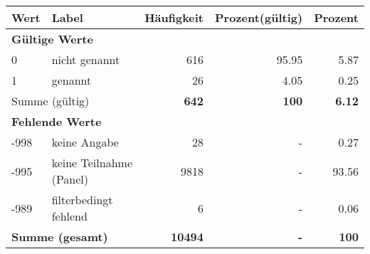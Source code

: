      \begin{longtable}{lXrrr}
     \toprule
     \textbf{Wert} & \textbf{Label} & \textbf{Häufigkeit} & \textbf{Prozent(gültig)} & \textbf{Prozent} \\
     \endhead
     \midrule
     \multicolumn{5}{l}{\textbf{Gültige Werte}}\\

     0 &
     \multicolumn{1}{X}{ nicht genannt   } &


       \num{616} &
       \num[round-mode=places,round-precision=2]{95.95} &
         \num[round-mode=places,round-precision=2]{5.87} \\

     1 &
     \multicolumn{1}{X}{ genannt   } &


       \num{26} &
       \num[round-mode=places,round-precision=2]{4.05} &
         \num[round-mode=places,round-precision=2]{0.25} \\
     \midrule
     \multicolumn{2}{l}{Summe (gültig)} &
       \textbf{\num{642}} &
     \textbf{\num{100}} &
       \textbf{\num[round-mode=places,round-precision=2]{6.12}} \\
     \multicolumn{5}{l}{\textbf{Fehlende Werte}}\\
       -998 &
       keine Angabe &
         \num{28} &
        - &
         \num[round-mode=places,round-precision=2]{0.27} \\
       -995 &
       keine Teilnahme (Panel) &
         \num{9818} &
        - &
         \num[round-mode=places,round-precision=2]{93.56} \\
       -989 &
       filterbedingt fehlend &
         \num{6} &
        - &
         \num[round-mode=places,round-precision=2]{0.06} \\
     \midrule
     \multicolumn{2}{l}{\textbf{Summe (gesamt)}} &
          \textbf{\num{10494}} &
        \textbf{-} &
        \textbf{\num{100}} \\
     \bottomrule
     \end{longtable}
     
